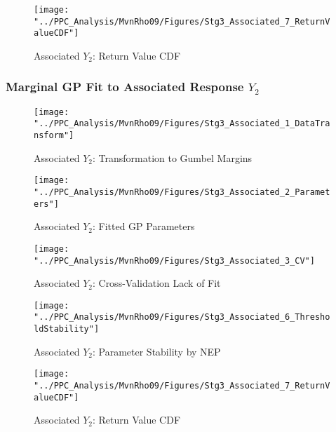 \begin{figure}
	\centering
	\texttt{[image: "../PPC\_Analysis/MvnRho09/Figures/Stg3\_Associated\_7\_ReturnValueCDF"]}
	\caption{Associated $Y_{2}$: Return Value CDF}
	\label{fig:CaseMvnMrg1RV}
\end{figure}



\subsubsection{Marginal GP Fit to Associated Response $Y_{2}$}




\begin{figure}
	\centering
	\texttt{[image: "../PPC\_Analysis/MvnRho09/Figures/Stg3\_Associated\_1\_DataTransform"]}
	\caption{Associated $Y_{2}$: Transformation to Gumbel Margins}
	\label{fig:CaseMvnMrg2DatTrns}
\end{figure}

\begin{figure}
	\centering
	\texttt{[image: "../PPC\_Analysis/MvnRho09/Figures/Stg3\_Associated\_2\_Parameters"]}
	\caption{Associated $Y_{2}$: Fitted GP Parameters}
	\label{fig:CaseMvnMrg2Prm}
\end{figure}

\begin{figure}
	\centering
	\texttt{[image: "../PPC\_Analysis/MvnRho09/Figures/Stg3\_Associated\_3\_CV"]}
	\caption{Associated $Y_{2}$: Cross-Validation Lack of Fit}
	\label{fig:CaseMvnMrg2CV}
\end{figure}

\begin{figure}
	\centering
	\texttt{[image: "../PPC\_Analysis/MvnRho09/Figures/Stg3\_Associated\_6\_ThresholdStability"]}
	\caption{Associated $Y_{2}$: Parameter Stability by NEP}
	\label{fig:CaseMvnMrg2Thr}
\end{figure}


\begin{figure}
	\centering
	\texttt{[image: "../PPC\_Analysis/MvnRho09/Figures/Stg3\_Associated\_7\_ReturnValueCDF"]}
	\caption{Associated $Y_{2}$: Return Value CDF}
	\label{fig:CaseMvnMrg2RV}
\end{figure}

